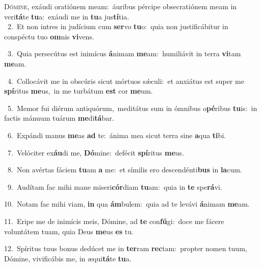 \lettrine{\initial\textcolor{\initialcolor}{D}}{ómine,} exáudi oratiónem meam:~\dagger áuribus pércipe obsecratiónem meam in veri\-\textbf{tá}\-te \textbf{tu}\-a:~\star exáudi me in \textbf{tu}\-a jus\-\textbf{tí}\-tia.\\
{\numbfont\textcolor{\numbcolor}{~2.}}~Et non intres in judícium cum \textbf{ser}\-vo \textbf{tu}\-o:~\star quia non justificábitur in conspéctu tuo \textbf{om}\-nis \textbf{vi}\-vens.\par
{\numbfont\textcolor{\numbcolor}{~3.}}~Quia persecútus est inimícus \textbf{á}\-nimam \textbf{me}\-am:~\star humiliávit in terra \textbf{vi}\-tam \textbf{me}\-am.\par
{\numbfont\textcolor{\numbcolor}{~4.}}~Collocávit me in obscúris sicut mórtuos sǽculi:~\dagger et anxiátus est super me \textbf{spí}\-ritus \textbf{me}\-us,~\star in me turbátum \textbf{est} cor \textbf{me}\-um.\par
{\numbfont\textcolor{\numbcolor}{~5.}}~Memor fui diérum antiquórum,~\dagger meditátus sum in ómnibus o\-\textbf{pé}\-ribus \textbf{tu}\-is:~\star in factis mánuum tuárum \textbf{me}\-di\-\textbf{tá}\-bar.\par
{\numbfont\textcolor{\numbcolor}{~6.}}~Expándi manus \textbf{me}\-as \textbf{ad} te:~\star ánima mea sicut terra sine \textbf{a}\-qua \textbf{ti}\-bi.\par
{\numbfont\textcolor{\numbcolor}{~7.}}~Velóciter ex\-\textbf{áu}\-di me, \textbf{Dó}\-mine:~\star defécit \textbf{spí}\-ritus \textbf{me}\-us.\par
{\numbfont\textcolor{\numbcolor}{~8.}}~Non avértas fáciem \textbf{tu}\-am \textbf{a} me:~\star et símilis ero descendénti\textbf{bus} in \textbf{la}\-cum.\par
{\numbfont\textcolor{\numbcolor}{~9.}}~Audítam fac mihi mane miseri\-\textbf{cór}\-diam \textbf{tu}\-am:~\star quia in \textbf{te} spe\-\textbf{rá}\-vi.\par
{\numbfont\textcolor{\numbcolor}{10.}}~Notam fac mihi viam, \textbf{in} qua \textbf{ám}\-bulem:~\star quia ad te levávi \textbf{á}\-nimam \textbf{me}\-am.\par
{\numbfont\textcolor{\numbcolor}{11.}}~Eripe me de inimícis meis, Dómine, ad \textbf{te} con\-\textbf{fú}\-gi:~\star doce me fácere voluntátem tuam, quia Deus \textbf{me}\-us \textbf{es} tu.\par
{\numbfont\textcolor{\numbcolor}{12.}}~Spíritus tuus bonus dedúcet me in \textbf{ter}\-ram \textbf{rec}\-tam:~\star propter nomen tuum, Dómine, vivificábis me, in æqui\-\textbf{tá}\-te \textbf{tu}\-a.\par
